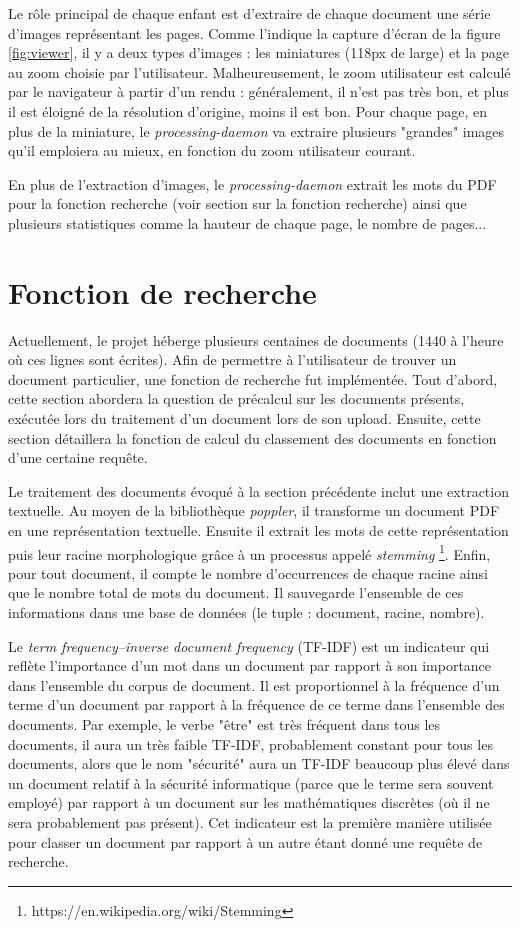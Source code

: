 \documentclass[a4paper,12pt]{article}
\begin{document}
Le rôle principal de chaque enfant est d'extraire de chaque document une série
d'images représentant les pages. Comme l'indique la capture d'écran de la figure \ref{fig:viewer},
il y a deux types d'images : les miniatures (118px de large) et la page au zoom 
choisie par l'utilisateur. Malheureusement, le zoom utilisateur est calculé par
le navigateur à partir d'un rendu : généralement, il n'est pas très bon, et plus il
est éloigné de la résolution d'origine, moins il est bon. Pour chaque page, en
plus de la miniature, le \textit{processing-daemon} va extraire plusieurs "grandes"
images qu'il emploiera au mieux, en fonction du zoom utilisateur courant.

En plus de l'extraction d'images, le \textit{processing-daemon} extrait les mots
du PDF pour la fonction recherche (voir section sur la fonction recherche) ainsi que
plusieurs statistiques comme la hauteur de chaque page, le nombre de pages...


\section{Fonction de recherche}

Actuellement, le projet héberge plusieurs centaines de documents (1440 à l'heure où ces lignes sont écrites).
Afin de permettre à l'utilisateur de trouver un document particulier, une
fonction de recherche fut implémentée. Tout d'abord, cette section abordera
la question de précalcul sur les documents présents, exécutée lors
du traitement d'un document lors de son upload. Ensuite, cette section
détaillera la fonction de calcul du classement des documents en fonction
d'une certaine requête.

Le traitement des documents évoqué à la section précédente inclut une extraction
textuelle. Au moyen de la bibliothèque \textit{poppler}, il transforme un document
PDF en une représentation textuelle. Ensuite il extrait les mots de cette représentation
puis leur racine morphologique grâce à un processus appelé \textit{stemming}
\footnote{https://en.wikipedia.org/wiki/Stemming}. Enfin, pour tout document,
il compte le nombre d'occurrences de chaque racine ainsi que le nombre total de mots du document.
Il sauvegarde l'ensemble de ces informations dans une base de données (le tuple : document, racine, nombre).

Le \textit{term frequency–inverse document frequency} (TF-IDF) est un indicateur
qui reflète l'importance d'un mot dans un document par rapport à son importance
dans l'ensemble du corpus de document. Il est proportionnel à la fréquence d'un terme
d'un document par rapport à la fréquence de ce terme dans l'ensemble des documents.
Par exemple, le verbe "être" est très fréquent dans tous les documents, il aura
un très faible TF-IDF, probablement constant pour tous les documents,
alors que le nom "sécurité" aura un TF-IDF beaucoup plus élevé dans un document
relatif à la sécurité informatique (parce que le terme sera souvent employé)
par rapport à un document sur les mathématiques discrètes (où il ne sera probablement
pas présent). Cet indicateur est la première manière utilisée pour classer
un document par rapport à un autre étant donné une requête de recherche.
\end{document}
